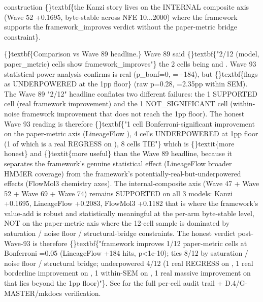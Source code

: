 \documentclass{article}
\begin{document}
construction  \{\}textbf\{the Kanzi story lives on the INTERNAL composite axis (Wave 52 +0.1695, byte-stable across NFE 10...2000) where the framework supports the framework\_improves verdict without the paper-metric bridge constraint\}.

\{\}textbf\{Comparison vs Wave 89 headline.\} Wave 89 said \{\}textbf\{"2/12 (model, paper\_metric) cells show framework\_improves"\}  the 2 cells being  and . Wave 93 statistical-power analysis confirms  is real (p\_bonf=0, =+184), but \{\}textbf\{flags  as UNDERPOWERED at the 1pp floor\} (raw p=0.28, =2.35pp within SEM). The Wave 89 "2/12" headline conflates two different failures: the 1 SUPPORTED cell (real framework improvement) and the 1 NOT\_SIGNIFICANT cell (within-noise framework improvement that does not reach the 1pp floor). The honest Wave 93 reading is therefore \{\}textbf\{"1 cell Bonferroni-significant improvement on the paper-metric axis (LineageFlow ), 4 cells UNDERPOWERED at 1pp floor (1 of which is a real REGRESS on ), 8 cells TIE"\}  which is \{\}textit\{more honest\} and \{\}textit\{more useful\} than the Wave 89 headline, because it separates the framework's genuine statistical effect (LineageFlow broader HMMER coverage) from the framework's potentially-real-but-underpowered effects (FlowMol3 chemistry axes). The internal-composite axis (Wave 47 + Wave 52 + Wave 69 + Wave 74) remains SUPPORTED on all 3 models: Kanzi +0.1695, LineageFlow +0.2083, FlowMol3 +0.1182  that is where the framework's value-add is robust and statistically meaningful at the per-arm byte-stable level, NOT on the paper-metric axis where the 12-cell sample is dominated by saturation / noise floor / structural-bridge constraints. The honest verdict post-Wave-93 is therefore \{\}textbf\{"framework improves 1/12 paper-metric cells at Bonferroni =0.05 (LineageFlow  +184 hits, p<1e-10); ties 8/12 by saturation / noise floor / structural bridge; underpowered 4/12 (1 real REGRESS on , 1 real borderline improvement on , 1 within-SEM on , 1 real massive improvement on  that lies beyond the 1pp floor)"\}. See  for the full per-cell audit trail + D.4/G-MASTER/mkdocs verification.
\end{document}

